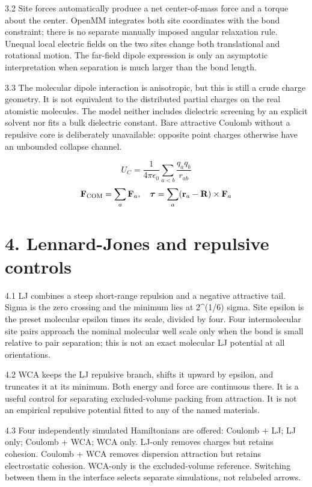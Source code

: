 \documentclass[11pt]{article}
\begin{document}
3.2 Site forces automatically produce a net center-of-mass force and a torque about the center. OpenMM integrates both site coordinates with the bond constraint; there is no separate manually imposed angular relaxation rule. Unequal local electric fields on the two sites change both translational and rotational motion. The far-field dipole expression is only an asymptotic interpretation when separation is much larger than the bond length.


3.3 The molecular dipole interaction is anisotropic, but this is still a crude charge geometry. It is not equivalent to the distributed partial charges on the real atomistic molecules. The model neither includes dielectric screening by an explicit solvent nor fits a bulk dielectric constant. Bare attractive Coulomb without a repulsive core is deliberately unavailable: opposite point charges otherwise have an unbounded collapse channel.


\[U_C=\frac{1}{4\pi\epsilon_0}\sum_{a<b}\frac{q_aq_b}{r_{ab}}\]
\[\mathbf{F}_{\rm COM}=\sum_a\mathbf{F}_a,\quad\boldsymbol{\tau}=\sum_a(\mathbf{r}_a-\mathbf{R})\times\mathbf{F}_a\]
\section*{4. Lennard-Jones and repulsive controls}
4.1 LJ combines a steep short-range repulsion and a negative attractive tail. Sigma is the zero crossing and the minimum lies at 2\textasciicircum{}(1/6) sigma. Site epsilon is the preset molecular epsilon times its scale, divided by four. Four intermolecular site pairs approach the nominal molecular well scale only when the bond is small relative to pair separation; this is not an exact molecular LJ potential at all orientations.


4.2 WCA keeps the LJ repulsive branch, shifts it upward by epsilon, and truncates it at its minimum. Both energy and force are continuous there. It is a useful control for separating excluded-volume packing from attraction. It is not an empirical repulsive potential fitted to any of the named materials.


4.3 Four independently simulated Hamiltonians are offered: Coulomb + LJ; LJ only; Coulomb + WCA; WCA only. LJ-only removes charges but retains cohesion. Coulomb + WCA removes dispersion attraction but retains electrostatic cohesion. WCA-only is the excluded-volume reference. Switching between them in the interface selects separate simulations, not relabeled arrows.
\end{document}
